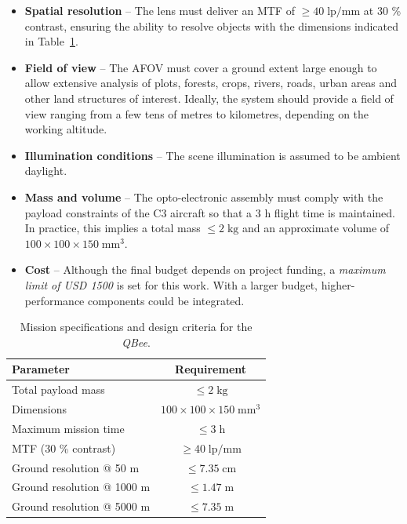 \begin{itemize}
    \item \textbf{Spatial resolution} – The lens must deliver an
          MTF of \textbf{$\ge 40\;\text{lp/mm}$} at 30 \% contrast,
          ensuring the ability to resolve objects with the dimensions
          indicated in Table~\ref{tab:req_vs_obj}.
          
    \item \textbf{Field of view} – The AFOV must cover a ground extent
          large enough to allow extensive analysis of plots, forests,
          crops, rivers, roads, urban areas and other land structures of
          interest.  Ideally, the system should provide a field of view
          ranging from a few tens of metres to kilometres, depending on
          the working altitude.
    
    \item \textbf{Illumination conditions} – The scene illumination is
          assumed to be ambient daylight.
    
    \item \textbf{Mass and volume} – The opto-electronic assembly must
          comply with the payload constraints of the C3 aircraft so that
          a 3 h flight time is maintained.  In practice, this implies a
          total mass $\le 2\;\text{kg}$ and an approximate volume of
          $100\times100\times150\;\text{mm}^{3}$.
          
    \item \textbf{Cost} – Although the final budget depends on project
          funding, a \emph{maximum limit of USD 1500} is set for this
          work.  With a larger budget, higher-performance components
          could be integrated.
\end{itemize}

\begin{table}[h]
  \centering
  \caption{Mission specifications and design criteria for the
           \textit{QBee}.}
  \label{tab:req_vs_obj}
  \begin{tabular}{|p{4cm}|c|}
      \hline
      \rowcolor[HTML]{EFEFEF}\textbf{Parameter} & \textbf{Requirement} \\ \hline
      Total payload mass & $\le 2\;\text{kg}$ \\ \hline
      Dimensions & $100 \times 100 \times 150\;\text{mm}^{3}$ \\ \hline
      Maximum mission time & $\le 3\;\text{h}$ \\ \hline
      MTF (30 \% contrast) & $\ge 40\;\text{lp/mm}$ \\ \hline
      Ground resolution @ 50 m & $\le 7.35\;\text{cm}$ \\ \hline
      Ground resolution @ 1000 m & $\le 1.47\;\text{m}$ \\ \hline
      Ground resolution @ 5000 m & $\le 7.35\;\text{m}$ \\ \hline
  \end{tabular}
\end{table}

